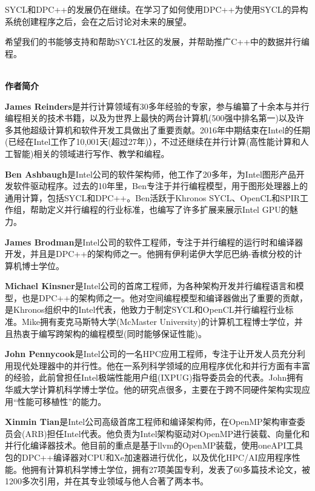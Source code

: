 \documentclass[11pt,a4paper,UTF8]{ctexart}
\begin{document}
	SYCL和DPC++的发展仍在继续。在学习了如何使用DPC++为使用SYCL的异构系统创建程序之后，会在之后讨论对未来的展望。\par
	
	希望我们的书能够支持和帮助SYCL社区的发展，并帮助推广C++中的数据并行编程。\par
	
	
	\hspace*{\fill} \\ %
	\noindent\textbf{作者简介}\ \par
	\textbf{James Reinders}是并行计算领域有30多年经验的专家，参与编纂了十余本与并行编程相关的技术书籍，以及为世界上最快的两台计算机(500强中排名第一)以及许多其他超级计算机和软件开发工具做出了重要贡献。2016年中期结束在Intel的任期(已经在Intel工作了10,001天(超过27年)），不过还继续在并行计算(高性能计算和人工智能)相关的领域进行写作、教学和编程。\par
	
	\textbf{Ben Ashbaugh}是Intel公司的软件架构师，他工作了20多年，为Intel图形产品开发软件驱动程序。过去的10年里，Ben专注于并行编程模型，用于图形处理器上的通用计算，包括SYCL和DPC++。Ben活跃于Khronos SYCL、OpenCL和SPIR工作组，帮助定义并行编程的行业标准，也编写了许多扩展来展示Intel GPU的魅力。\par
	
	\textbf{James Brodman}是Intel公司的软件工程师，专注于并行编程的运行时和编译器开发，并且是DPC++的架构师之一。他拥有伊利诺伊大学厄巴纳-香槟分校的计算机博士学位。\par
	
	\textbf{Michael Kinsner}是Intel公司的首席工程师，为各种架构开发并行编程语言和模型，也是DPC++的架构师之一。他对空间编程模型和编译器做出了重要的贡献，是Khronos组织中的Intel代表，他致力于制定SYCL和OpenCL并行编程行业标准。Mike拥有麦克马斯特大学(McMaster University)的计算机工程博士学位，并且热衷于编写跨架构的编程模型(同时能够保证性能)。\par
	
	\textbf{John Pennycook}是Intel公司的一名HPC应用工程师，专注于让开发人员充分利用现代处理器中的并行性。他在一系列科学领域的应用程序优化和并行方面有丰富的经验，此前曾担任Intel极端性能用户组(IXPUG)指导委员会的代表。John拥有华威大学计算机科学博士学位。他的研究点很多，主要在于跨不同硬件架构实现应用“性能可移植性”的能力。\par
	
	\textbf{Xinmin Tian}是Intel公司高级首席工程师和编译架构师，在OpenMP架构审查委员会(ARB)担任Intel代表。他负责为Intel架构驱动对OpenMP进行装载、向量化和并行化编译器技术。他目前的重点是基于llvm的OpenMP装载，使用oneAPI工具包的DPC++编译器对CPU和Xe加速器进行优化，以及优化HPC/AI应用程序性能。他拥有计算机科学博士学位，拥有27项美国专利，发表了60多篇技术论文，被1200多次引用，并在其专业领域与他人合著了两本书。\par
	
\end{document}

